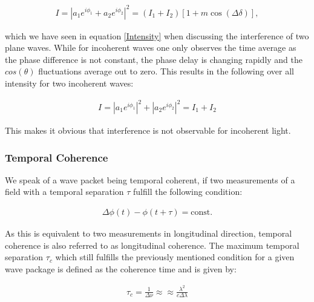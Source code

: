 \begin{align}
I=\left| a_1 e^{i \phi_1} + a_2 e^{i \phi_2} \right|^2 = \left(I_1+I_2 \right) \left[ 1 + m \cos(\Delta \delta)\right], 
\end{align}

which we have seen in equation \ref{Intensity} when discussing the interference of two plane waves.
While for incoherent waves one only observes the time average as the phase difference is not constant, the phase delay is changing rapidly and the $cos(\theta)$ fluctuations average out to zero. This results in the following over all intensity for two incoherent waves:

\begin{align}
I=\left| a_1 e^{i \phi_1} \right|^2+ \left| a_2 e^{i \phi_2}\right|^2 = I_1+I_2
\end{align}

This makes it obvious that interference is not observable for incoherent light.\cite{coherence}




\subsubsection{Temporal Coherence}
We speak of a wave packet being temporal coherent, if two measurements of a field with a temporal separation $\tau$ fulfill the following condition:

\begin{align}
\Delta \phi \left( t \right) - \phi\left( t + \tau\right)  = \text{const.}
\end{align}

As this is equivalent to two measurements in longitudinal direction, temporal coherence is also referred to as longitudinal coherence. The maximum temporal separation $\tau_c$ which still fulfills the previously mentioned condition for a given wave package is defined as the coherence time and is given by:

\begin{align}
\tau_c = \frac{1}{\Delta \nu} \approx\approx \frac{\lambda^2}{c\Delta \lambda}
\end{align}

